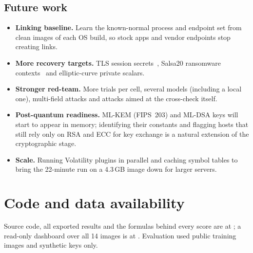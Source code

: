 \subsection{Future work}
\begin{itemize}
  \item \textbf{Linking baseline.} Learn the known-normal process and endpoint set from clean images of each OS
        build, so stock apps and vendor endpoints stop creating links.
  \item \textbf{More recovery targets.} TLS session secrets~\cite{baier2024tls}, Salsa20 ransomware
        contexts~\cite{babiano2023evaluation} and elliptic-curve private scalars.
  \item \textbf{Stronger red-team.} More trials per cell, several models (including a local one), multi-field
        attacks and attacks aimed at the cross-check itself.
  \item \textbf{Post-quantum readiness.} ML-KEM (FIPS~203) and ML-DSA keys will start to appear
        in memory; identifying their constants and flagging hosts that still rely only on RSA and ECC for key
        exchange is a natural extension of the cryptographic stage.
  \item \textbf{Scale.} Running Volatility plugins in parallel and caching symbol tables to bring the 22-minute
        run on a 4.3\,GB image down for larger servers.
\end{itemize}

\section*{Code and data availability}
Source code, all exported results and the formulas behind every score are at \repo; a read-only dashboard over
all 14 images is at \demo. Evaluation used public training images and synthetic keys only.
